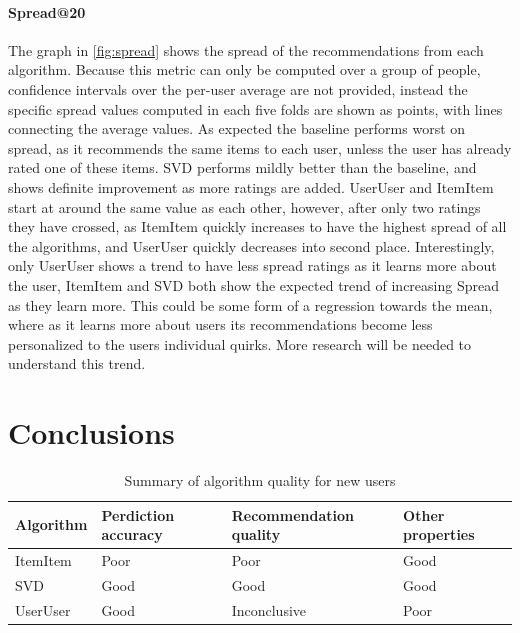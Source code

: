 \documentclass[letterpaper]{sig-alternate}
\begin{document}
  \paragraph{Spread@20}
  The graph in \ref{fig:spread} shows the spread of the recommendations from each algorithm.
  Because this metric can only be computed over a group of people, confidence intervals over the per-user average are not provided, instead the specific spread values computed in each five folds are shown as points, with lines connecting the average values.
  As expected the baseline performs worst on spread, as it recommends the same items to each user, unless the user has already rated one of these items.
  SVD performs mildly better than the baseline, and shows definite improvement as more ratings are added.
  UserUser and ItemItem start at around the same value as each other, however, after only two ratings they have crossed, as ItemItem quickly increases to have the highest spread of all the algorithms, and UserUser quickly decreases into second place.
  Interestingly, only UserUser shows a trend to have less spread ratings as it learns more about the user, ItemItem and SVD both show the expected trend of increasing Spread as they learn more.
  This could be some form of a regression towards the mean, where as it learns more about users its recommendations become less personalized to the users individual quirks.
  More research will be needed to understand this trend.
  
\section{Conclusions}
  \begin{table}[ht!]
    \centering
    \begin{tabular}{|p{4.5em}|p{4.5em}|p{7.5em}|p{4.5em}|}
      \hline
      Algorithm & Perdiction accuracy & Recommendation quality      & Other properties \\\hline
      ItemItem  & Poor                & Poor                        & Good             \\\hline
      SVD       & Good                & Good                        & Good             \\\hline
      UserUser  & Good                & Inconclusive                & Poor             \\\hline
    \end{tabular}
    \caption{Summary of algorithm quality for new users}
    \label{tbl:results}
  \end{table}
\end{document}
